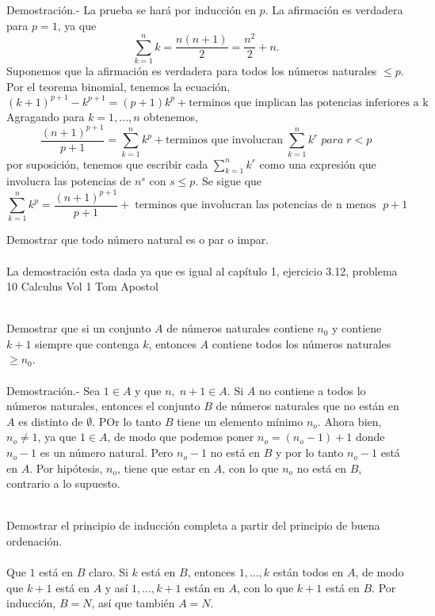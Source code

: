 \begin{teo}
Demostración.- \; La prueba se hará por inducción en $p$. La afirmación es verdadera para $p=1$, ya que $$\displaystyle\sum_{k=1}^n k = \dfrac{n(n+1)}{2} = \dfrac{n^2}{2} + n.$$
Suponemos que la afirmación es verdadera para todos los números naturales $\leq p$. Por el teorema binomial, tenemos la ecuación, $$(k+1)^{p+1} - k^{p+1} = (p+1)k^p + \mbox{terminos que implican las potencias inferiores a k}$$
Agragando para $k=1,...,n$ obtenemos,
$$\dfrac{(n+1)^{p+1}}{p+1} = \displaystyle\sum_{k=1}^n k^p + \mbox{terminos que involucran} \; \sum_{k=1}^n k^r \; para \; r<p$$
por suposición, tenemos que escribir cada $\displaystyle\sum_{k=1}^n k^r$ como una expresión que involucra las potencias de $n^s$ con $s\leq p$. Se sigue que $$\displaystyle\sum_{k=1}^n k^p = \dfrac{(n+1)^{p+1}}{p+1} + \; \mbox{terminos que involucran las potencias de n menos } \; p+1$$
\end{teo} 

\begin{teo}
Demostrar que todo número natural es o par o impar.\\\\
La demostración esta dada ya que es igual al capítulo 1, ejercicio 3.12, problema 10 Calculus Vol 1 Tom Apostol\\\\
\end{teo}

\begin{teo}
Demostrar que si un conjunto $A$ de números naturales contiene $n_0$ y contiene $k+1$ siempre que contenga $k$, entonces $A$ contiene todos los números naturales $\geq n_0$.\\\\
Demostración.- \; Sea $1 \in A$ y que $n, \; n+1 \in A$. Si $A$ no contiene a todos lo números naturales, entonces el conjunto $B$ de números naturales que no están en $A$ es distinto de $\emptyset$. POr lo tanto $B$ tiene un elemento mínimo $n_o$. Ahora bien, $n_o \neq 1$, ya que $1 \in A$, de modo que podemos poner $n_o = (n_o -1) + 1$ donde $n_o - 1$ es un número natural. Pero $n_o-1$ no está en $B$ y por lo tanto $n_o -1$ está en $A$. Por hipótesis, $n_o$, tiene que estar en $A$, con lo que $n_o$ no está en $B$, contrario a lo supuesto.\\\\
\end{teo}

\begin{teo}
Demostrar el principio de inducción completa a partir del principio de buena ordenación.\\\\
Que $1$ está en $B$ claro. Si $k$ está en $B$, entonces $1,...,k$ están todos en $A$, de modo que $k+1$ está en $A$ y así $1,...,k+1$ están en $A$, con lo que $k+1$ está en $B$. Por inducción, $B=N$, así que también $A=N$.\\\\
\end{teo}

